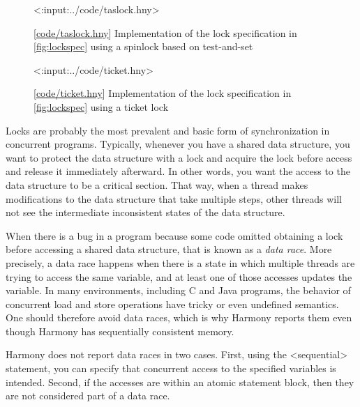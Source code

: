 \documentclass{report}
\newcommand{\harmonylink}[1]{%
[\href{https://harmony.cs.cornell.edu/#1}{\underline{#1}}]%
}
\newenvironment{code}{
\tcolorbox
}{
\endtcolorbox
}
\begin{document}
\begin{figure}
\begin{code}
<{:input:../code/taslock.hny}>
\end{code}
\caption{\harmonylink{code/taslock.hny} Implementation of the lock
specification in \autoref{fig:lockspec} using a spinlock based on
test-and-set}
\label{fig:tas2}
\end{figure}

\begin{figure}
\begin{code}
<{:input:../code/ticket.hny}>
\end{code}
\caption{\harmonylink{code/ticket.hny} Implementation of the lock
specification in \autoref{fig:lockspec} using a ticket lock}
\label{fig:ticket}
\end{figure}

Locks are probably the most prevalent and basic form of synchronization
in concurrent programs.  Typically, whenever you have a shared data
structure, you want to protect the data structure with a lock and
acquire the lock before access and release it immediately afterward.
In other words, you want the access to the data structure to be a
critical section.
That way, when a thread makes modifications to the data structure that take
multiple steps, other threads will not see the intermediate inconsistent
states of the data structure.

%
%
When there is a bug in a program because some code omitted obtaining
a lock before accessing a shared data structure, that is known as a
\emph{data race}.
More precisely, a data race happens when there is a state in which multiple
threads are trying to access the same variable, and at least one of those
accesses updates the variable.
In many environments, including C and Java programs, the behavior of
concurrent load and store operations have tricky or even undefined
semantics.  One should therefore avoid data races, which is why Harmony
reports them even though Harmony has sequentially consistent memory.

Harmony does not report data races in two cases.
First, using the <{sequential}> statement, you can specify that
concurrent access to the specified variables is intended.
Second, if the accesses are within an atomic statement block, then they
are not considered part of a data race.
\end{document}
